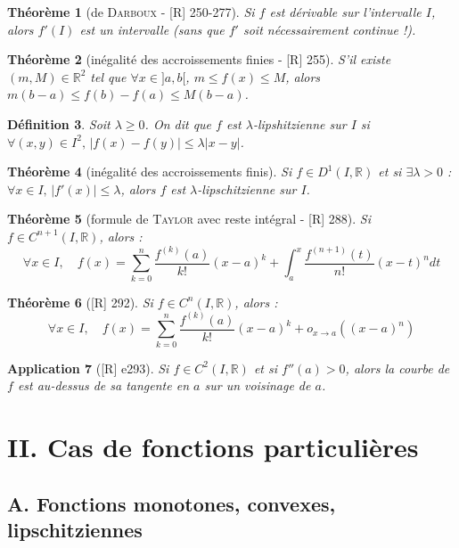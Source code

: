 \documentclass[10pt, a4paper, parskip=full, twoside, twocolumn]{report}
\newtheorem{definition}{Définition}
\newtheorem{theorem}[definition]{Théorème}
\newtheorem{application}[definition]{Application}
\newcommand{\IR}{\mathbb{R}}
\begin{document}
\begin{theorem}[de \textsc{Darboux} - \textnormal{[R] 250-277}]
	Si $f$ est dérivable sur l'intervalle $I$, alors $f'(I)$ est un intervalle (sans que $f'$ soit nécessairement continue !).
\end{theorem}

\begin{theorem}[inégalité des accroissements finies - \textnormal{[R] 255}]
	S'il existe $(m,M)\in \IR^2$ tel que $\forall x\in ]a,b[$, $m\leq f(x)\leq M$, alors $m(b-a)\leq f(b)-f(a)\leq M(b-a)$.
\end{theorem}

\begin{definition}
	Soit $\lambda \geq 0$. On dit que $f$ est \emph{$\lambda$-lipshitzienne sur $I$} si $\forall (x,y)\in I^2,\, \vert f(x)-f(y)\vert \leq \lambda \vert x-y\vert$.
\end{definition}

\begin{theorem}[inégalité des accroissements finis]
	Si $f\in D^1(I,\IR)$ et si $\exists \lambda >0$ : $\forall x\in I,\, \vert f'(x)\vert \leq \lambda$, alors $f$ est $\lambda$-lipschitzienne sur $I$.
\end{theorem}

\begin{theorem}[formule de \textsc{Taylor} avec reste intégral - \textnormal{[R] 288}]
	Si $f\in C^{n+1}(I,\IR)$, alors :
	$$\forall x\in I,\quad f(x) = \sum_{k=0}^{n} \frac{f^{(k)}(a)}{k!}(x-a)^k + \int_{a}^{x} \frac{f^{(n+1)}(t)}{n!}(x-t)^ndt$$
\end{theorem}

\begin{theorem}[\textnormal{[R] 292}]
	Si $f\in C^n(I,\IR)$, alors :
	$$\forall x\in I,\quad f(x) = \sum_{k=0}^{n} \frac{f^{(k)}(a)}{k!}(x-a)^k + o_{x\to a}((x-a)^n)$$
\end{theorem}

\begin{application}[\textnormal{[R] e293}]
	Si $f\in C^2(I,\IR)$ et si $f''(a) > 0$, alors la courbe de $f$ est au-dessus de sa tangente en $a$ sur un voisinage de $a$.
\end{application}

\section*{II. Cas de fonctions particulières}
\subsection*{A. Fonctions monotones, convexes, lipschitziennes}
\end{document}
